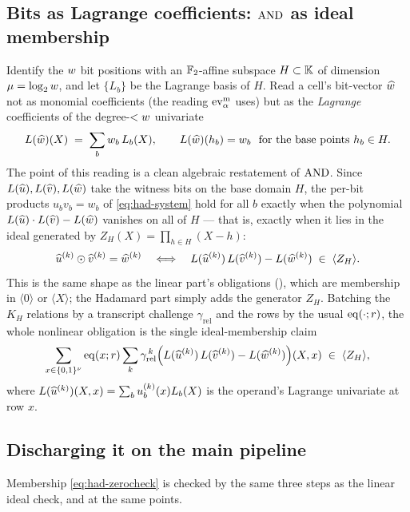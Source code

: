 \subsection{Bits as Lagrange coefficients: $\operatorname{AND}$ as ideal membership}
\label{sec:psi-z}

Identify the $w$ bit positions with an $\mathbb{F}_2$-affine subspace
$H\subset\mathbb{K}$ of dimension $\mu=\log_2w$, and let $\{L_b\}$ be the Lagrange
basis of $H$. Read a cell's bit-vector $\widehat{w}$ not as monomial coefficients
(the reading $\operatorname{ev}^{\mathrm{m}}_{\alpha}$ uses) but as the \emph{Lagrange} coefficients of the
degree-$<w$ univariate
\[
  L(\widehat{w})(X) \;=\; \sum_b w_b\,L_b(X),
  \qquad L(\widehat{w})(h_b) = w_b \ \text{ for the base points } h_b\in H .
\]
The point of this reading is a clean algebraic restatement of $\operatorname{AND}$. Since
$L(\widehat{u}),L(\widehat{v}),L(\widehat{w})$ take the witness bits on the base domain $H$,
the per-bit products $u_bv_b=w_b$ of \eqref{eq:had-system} hold for all $b$
exactly when the polynomial $L(\widehat{u})\cdot L(\widehat{v}) - L(\widehat{w})$ vanishes on
all of $H$ --- that is, exactly when it lies in the ideal generated by
$Z_H(X)=\prod_{h\in H}(X-h)$:
\begin{equation}
  \label{eq:had-ideal}
  \widehat{u}^{(k)}\odot\widehat{v}^{(k)} = \widehat{w}^{(k)}
  \quad\Longleftrightarrow\quad
  L(\widehat{u}^{(k)})\,L(\widehat{v}^{(k)}) - L(\widehat{w}^{(k)}) \;\in\; \langle Z_H\rangle .
\end{equation}
This is the same shape as the linear part's obligations (),
which are membership in $\langle 0\rangle$ or $\langle X\rangle$; the
Hadamard part simply adds the generator $Z_H$. Batching the $K_H$ relations by a transcript challenge
$\gamma_{\mathrm{rel}}$ and the rows by the usual $\operatorname{eq}(\cdot;r)$, the whole
nonlinear obligation is the single ideal-membership claim
\begin{equation}
  \label{eq:had-zerocheck}
  \sum_{x\in\{0,1\}^{\nu}} \operatorname{eq}(x;r)
  \sum_{k} \gamma_{\mathrm{rel}}^{\,k}
  \Bigl(L(\widehat{u}^{(k)})\,L(\widehat{v}^{(k)}) - L(\widehat{w}^{(k)})\Bigr)(X,x)
  \;\in\; \langle Z_H\rangle ,
\end{equation}
where $L(\widehat{u}^{(k)})(X,x)=\sum_b u^{(k)}_b(x)L_b(X)$ is the operand's
Lagrange univariate at row $x$.

\subsection{Discharging it on the main pipeline}
\label{sec:had-pipeline}

Membership \eqref{eq:had-zerocheck} is checked by the same three steps as the
linear ideal check, and at the same points.

